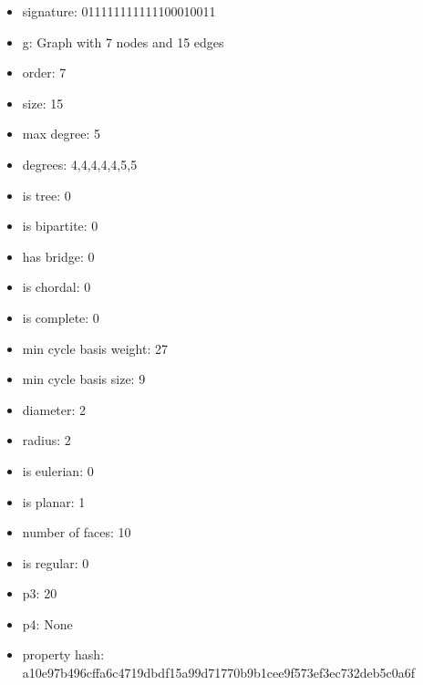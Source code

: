 \begin{itemize}
\item signature: 011111111111100010011
\item g: Graph with 7 nodes and 15 edges
\item order: 7
\item size: 15
\item max degree: 5
\item degrees: 4,4,4,4,4,5,5
\item is tree: 0
\item is bipartite: 0
\item has bridge: 0
\item is chordal: 0
\item is complete: 0
\item min cycle basis weight: 27
\item min cycle basis size: 9
\item diameter: 2
\item radius: 2
\item is eulerian: 0
\item is planar: 1
\item number of faces: 10
\item is regular: 0
\item p3: 20
\item p4: None
\item property hash: a10e97b496cffa6c4719dbdf15a99d71770b9b1cee9f573ef3ec732deb5c0a6f
\end{itemize}
\newpage
